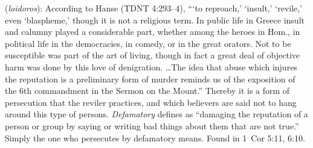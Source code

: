 \item[Defamatory,]

(\textit{loidoros}):
According to Hanse (TDNT 4:293--4), ```to reproach,' `insult,' `revile,' even `blaspheme,' though it is not a religious term. In public life in Greece insult and calumny played a considerable part, whether among the heroes in Hom., in political life in the democracies, in comedy, or in the great orators. Not to be susceptible was part of the art of living, though in fact a great deal of objective harm was done by this love of denigration. \ldots The idea that abuse which injures the reputation is a preliminary form of murder reminds us of the exposition of the 6th commandment in the Sermon on the Mount.'' Thereby it is a form of persecution that the reviler practices, and which believers are said not to hang around this type of persons. \emph{Defamatory} defines as ``damaging the reputation of a person or group by saying or writing bad things about them that are not true.'' Simply the one who persecutes by defamatory means.
Found in 1~Cor 5:11, 6:10.
